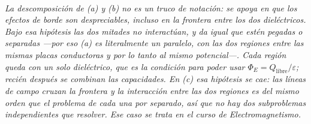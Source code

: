 \begin{center}
\\[0.5em]
{\small\itshape La descomposición de (a) y (b) no es un truco de notación: se
apoya en que los efectos de borde son despreciables, incluso en la frontera
entre los dos dieléctricos. Bajo esa hipótesis las dos mitades \emph{no
interactúan}, y da igual que estén pegadas o separadas ---por eso (a) es
literalmente un paralelo, con las dos regiones entre las mismas placas
conductoras y por lo tanto al mismo potencial---. Cada región queda con un solo
dieléctrico, que es la condición para poder usar $\Phi_E = Q_{\text{libre}}/
\varepsilon$; recién después se combinan las capacidades. En (c) esa hipótesis
se cae: las líneas de campo cruzan la frontera y la interacción entre las dos
regiones es del mismo orden que el problema de cada una por separado, así que no
hay dos subproblemas independientes que resolver. Ese caso se trata en el curso
de Electromagnetismo.}
\end{center}
